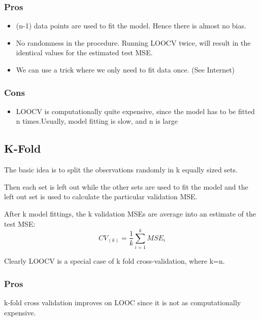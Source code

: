 \documentclass[../Main.tex]{subfiles}
\begin{document}
\begin{multicols}{2}
    \subsubsection{Pros}
    \begin{itemize}
        \item (n-1) data points are used to fit the model.  Hence there is almost no bias.
        \item  No randomness in the procedure. Running LOOCV twice, will result in the 
        identical values for the estimated test MSE.
        \item We can use a trick where we only need to fit data once. (See Internet)
    \end{itemize}

    \subsubsection{Cons}
    \begin{itemize}
        \item LOOCV is computationally quite 
        expensive, since the model has to be 
        fitted n times.Usually, model fitting is slow, and n is large
    \end{itemize}

    \subsection{K-Fold}
    The basic idea is to split the 
    observations randomly in k
    equally sized sets.

    Then each set is left out while the other 
    sets are used to fit the model and the left 
    out set is used to calculate the particular 
    validation MSE.

    After k model fittings, the k validation MSEs 
    are average into an estimate of the test 
    MSE:
    \begin{equation*}
        CV_{(k)} = \frac{1}{k} \sum_{i=1}^{k} MSE_i
    \end{equation*}

    Clearly LOOCV is a special case of k
    fold cross-validation, where k=n.

    \subsubsection{Pros}
    k-fold cross validation improves on LOOC since it is not as computationally expensive.
\end{multicols}
\end{document}
